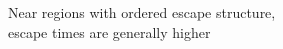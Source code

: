 \documentclass[preview]{standalone}
\begin{document}
Near regions with ordered escape structure,\\ escape times are generally higher\\
\end{document}
